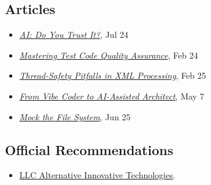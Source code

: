 \documentclass{vl}
\begin{document}
    \subsection*{Articles}
    \begin{itemize}
        \itemsep0em
        \item\emph{\href{https://dzone.com/articles/ai-do-you-trust-it}{AI: Do You Trust It?}}, Jul 24
        \item\emph{\href{https://dzone.com/articles/mastering-test-code-quality-assurance}{Mastering Test Code Quality
        Assurance}}, Feb 24
        \item\emph{\href{https://dzone.com/articles/thread-safety-pitfalls-in-xml-processing}{Thread-Safety Pitfalls in XML Processing}}, Feb 25
        \item\emph{\href{https://dev.to/volodya-lombrozo/from-vibe-coder-to-ai-assisted-architect-1nao}{From Vibe Coder to AI-Assisted Architect}}, May 7
        \item\emph{\href{https://dzone.com/articles/mock-the-file-system}{Mock the File System}}, Jun 25
    \end{itemize}

    \subsection*{Official Recommendations}
    \begin{itemize}
        \itemsep0em
        \item \href{https://github.com/volodya-lombrozo/volodya-lombrozo.github.io/blob/24eb2bbed8fac71c90ddef6ff4d93de8fb4f9f26/_cv/recommendations/letter_of_recommendation_ait.pdf}{LLC Alternative Innovative Technologies}.
    \end{itemize}
\end{document}
